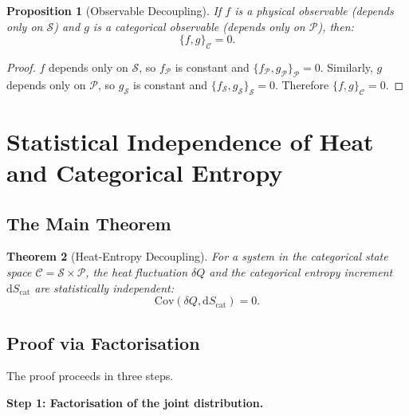 \documentclass[twocolumn,10pt]{article}
\newtheorem{theorem}{Theorem}[section]
\newtheorem{proposition}[theorem]{Proposition}
\newcommand{\dQ}{\delta Q}
\newcommand{\dS}{\mathrm{d}S}
\newcommand{\Cov}{\mathrm{Cov}}
\begin{document}
\begin{proposition}[Observable Decoupling]
\label{prop:decoupling}
If $f$ is a physical observable (depends only on $\mathcal{S}$) and $g$ is a categorical observable (depends only on $\mathcal{P}$), then:
\begin{equation}
    \{f, g\}_{\mathcal{C}} = 0.
\end{equation}
\end{proposition}

\begin{proof}
$f$ depends only on $\mathcal{S}$, so $f_\mathcal{P}$ is constant and $\{f_\mathcal{P}, g_\mathcal{P}\}_\mathcal{P} = 0$. Similarly, $g$ depends only on $\mathcal{P}$, so $g_\mathcal{S}$ is constant and $\{f_\mathcal{S}, g_\mathcal{S}\}_\mathcal{S} = 0$. Therefore $\{f, g\}_\mathcal{C} = 0$.
\end{proof}

\section{Statistical Independence of Heat and Categorical Entropy}
\label{sec:independence}

\subsection{The Main Theorem}

\begin{theorem}[Heat-Entropy Decoupling]
\label{thm:decoupling}
For a system in the categorical state space $\mathcal{C} = \mathcal{S} \times \mathcal{P}$, the heat fluctuation $\dQ$ and the categorical entropy increment $\dS_{\mathrm{cat}}$ are statistically independent:
\begin{equation}
    \Cov(\dQ, \dS_{\mathrm{cat}}) = 0.
    \label{eq:cov}
\end{equation}
\end{theorem}

\subsection{Proof via Factorisation}

The proof proceeds in three steps.

\textbf{Step 1: Factorisation of the joint distribution.}
\end{document}
